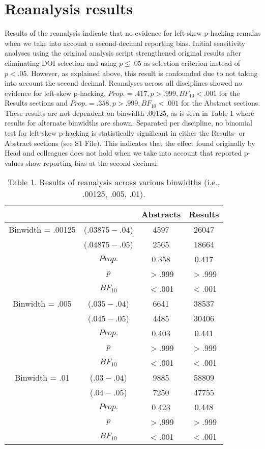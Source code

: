\section*{Reanalysis results}
Results of the reanalysis indicate that no evidence for left-skew p-hacking remains when we take into account a second-decimal reporting bias. Initial sensitivity analyses using the original analysis script strengthened original results after eliminating DOI selection and using $p\leq.05$ as selection criterion instead of $p<.05$. However, as explained above, this result is confounded due to not taking into account the second decimal. Reanalyses across all disciplines showed no evidence for left-skew p-hacking, $Prop.=.417,p>.999, BF_{10}<.001$ for the Results sections and $Prop.=.358,p>.999,BF_{10}<.001$ for the Abstract sections. These results are not dependent on binwidth .00125, as is seen in Table 1 where results for alternate binwidths are shown.  Separated per discipline, no binomial test for left-skew p-hacking is statistically significant in either the Results- or Abstract sections (see S1 File). This indicates that the effect found originally by Head and colleagues does not hold when we take into account that reported p-values show reporting bias at the second decimal.

\begin{table}[htbp]
    \begin{tabular}{cccc}
              &       & Abstracts & Results \\
              \hline
      Binwidth = .00125 & ($.03875-.04$) & 4597  & 26047 \\
          & ($.04875-.05$) & 2565  & 18664 \\
          & $Prop.$ & 0.358 & 0.417 \\
          & $p$     & $>$.999 & $>$.999 \\
          & $BF_{10}$  & $<$.001 & $<$.001 \\
    Binwidth = .005 & ($.035-.04$) & 6641  & 38537 \\
          & ($.045-.05$) & 4485  & 30406 \\
          & $Prop.$ & 0.403 & 0.441 \\
          & $p$     & $>$.999 & $>$.999 \\
          & $BF_{10}$  & $<$.001 & $<$.001 \\
    Binwidth = .01 & ($.03-.04$) & 9885  & 58809 \\
          & ($.04-.05$) & 7250  & 47755 \\
          & $Prop.$ & 0.423 & 0.448 \\
          & $p$     & $>$.999 & $>$.999 \\
          & $BF_{10}$  & $<$.001 & $<$.001 \\

    \end{tabular}
    \caption{Table 1. Results of reanalysis across various binwidths (i.e., .00125, .005, .01).} 
\end{table}
  
  